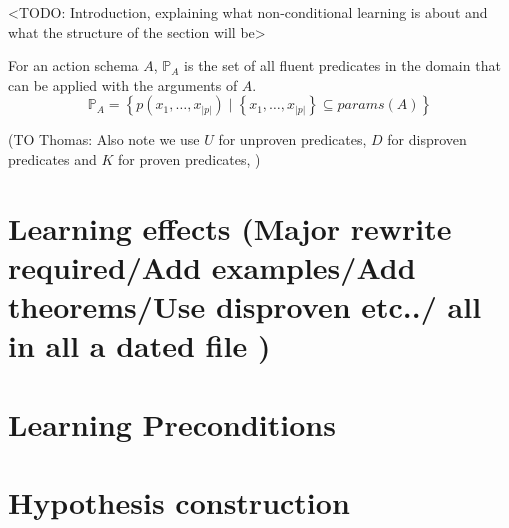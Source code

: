 \documentclass[Master.tex]{subfiles}
\begin{document}
<TODO: Introduction, explaining what non-conditional learning is about and what the structure of the section will be>

For an action schema $A$, $\mathbb{P}_A$ is the set of all fluent predicates in the domain that can be applied with the arguments of $A$.
\[
\mathbb{P}_A = \left\{
p \left( x_1, \dots, x_{|p|} \right)
\; | \; \left\{ x_1, \dots, x_{|p|} \right\} \subseteq params(A)
\right\}
\]


(TO Thomas: Also note we use $U$ for unproven predicates, $D$ for disproven predicates and $K$ for proven predicates, )

\section{Learning effects (Major rewrite required/Add examples/Add theorems/Use disproven etc../ all in all a dated file )}
    

\section{Learning Preconditions}
    

\section{Hypothesis construction}
	
\end{document}
